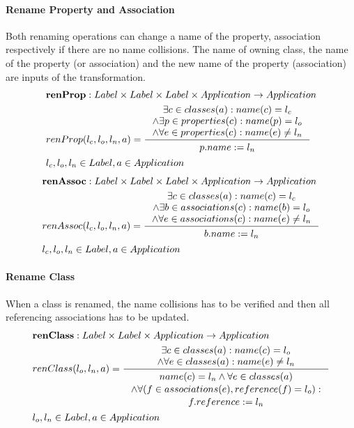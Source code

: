 \documentclass[11pt]{article}
\begin{document}
\paragraph{Rename Property and Association} Both renaming operations can change a name of the property, association respectively if there are no name collisions. The name of owning class, the name of the property (or association) and the new name of the property (association) are inputs of the transformation.
\begin{align*}
&	\mathbf{renProp} : Label \times Label \times Label \times Application \rightarrow Application \\
&	renProp(l_c, l_o, l_n, a) = \inference{\exists c \in classes(a) : name(c) = l_c \\ \wedge \exists p \in properties(c) : name(p) = l_o \\ \wedge \forall e \in properties(c) : name(e) \neq l_n
	}{\begin{gathered}
		p.name := l_n 
	\end{gathered}}\\
&	l_c, l_o, l_n \in Label, a \in Application
\end{align*}
\begin{align*}
&	\mathbf{renAssoc} : Label \times Label \times Label \times Application \rightarrow Application \\
&	renAssoc(l_c, l_o, l_n, a) = \inference{\exists c \in classes(a) : name(c) = l_c \\ \wedge \exists b \in associations(c) : name(b) = l_o \\ \wedge \forall e \in associations(c) : name(e) \neq l_n
	}{\begin{gathered}
		b.name := l_n 
	\end{gathered}}
	\\ & l_c, l_o, l_n \in Label, a \in Application
\end{align*}

\paragraph{Rename Class} When a class is renamed, the name collisions has to be verified and then all referencing associations has to be updated.
\begin{align*}
&	\mathbf{renClass} :  Label \times Label \times Application \rightarrow Application \\
&	renClass(l_o, l_n, a) = \inference{\exists c \in classes(a) : name(c) = l_o \\ \wedge \forall e \in classes(a) : name(e) \neq l_n
	}{\begin{gathered}
		name(c) = l_n \wedge \forall e \in classes(a) \\ \wedge \forall (f \in associations(e), reference(f) = l_o ) :\\ f.reference := l_n 
	\end{gathered}}\\
& l_o, l_n \in Label, a \in Application	
\end{align*}
\end{document}
